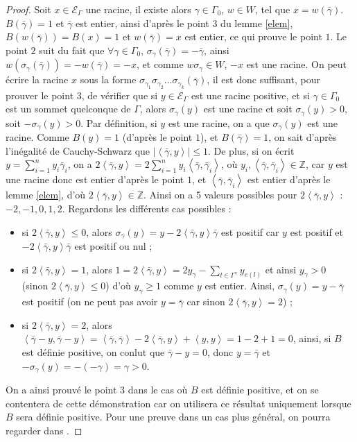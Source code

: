 \documentclass[a4paper,11pt]{article}
\newcommand{\ps}[2]{\left\langle#1,#2\right\rangle}
\newcommand{\EG}{\mathscr{E}_\Gamma}
\begin{document}
\begin{proof}
	Soit $x\in\EG$ une racine, il existe alors $\gamma\in\Gamma_0$, $w\in W$, tel que $x=w(\bar\gamma)$. $B(\bar\gamma)=1$ et $\bar\gamma$ est entier, ainsi d'après le point $3$ du lemme \ref{elem}, $B(w(\bar\gamma))=B(x)=1$ et $w(\bar\gamma)=x$ est entier, ce qui prouve le point $1$. Le point $2$ suit du fait que $\forall\gamma\in\Gamma_0$, $\sigma_\gamma(\bar\gamma)=-\bar\gamma$, ainsi $w(\sigma_\gamma(\bar\gamma))=-w(\bar\gamma)=-x$, et comme $w\sigma_\gamma\in W$, $-x$ est une racine. On peut écrire la racine $x$ sous la forme $\sigma_{\gamma_1}\sigma_{\gamma_2}\dots\sigma_{\gamma_k}(\bar\gamma)$, il est donc suffisant, pour prouver le point $3$, de vérifier que si $y\in\EG$ est une racine positive, et si $\gamma\in\Gamma_0$ est un sommet quelconque de $\Gamma$, alors $\sigma_\gamma(y)$ est une racine et soit $\sigma_\gamma(y)>0$, soit $-\sigma_\gamma(y)>0$. Par définition, si $y$ est une racine, on a que $\sigma_\gamma(y)$ est une racine. Comme $B(y)=1$ (d'après le point $1$), et $B(\bar\gamma)=1$, on sait d'après l'inégalité de Cauchy-Schwarz que $|\ps{\bar\gamma}{y}|\leq1$. De plus, si on écrit $y=\sum_{i=1}^ny_{i}\bar\gamma_i$, on a $2\ps{\bar\gamma}{y}=2\sum_{i=1}^ny_i\ps{\bar\gamma}{\bar\gamma_i}$, où $y_i,\ps{\bar\gamma}{\bar\gamma_i}\in\mathbb Z$, car $y$ est une racine donc est entier d'après le point $1$, et $\ps{\bar\gamma}{\bar\gamma_i}$ est entier d'après le lemme \ref{elem}, d'où $2\ps{\bar\gamma}{y}\in\mathbb Z$. Ainsi on a 5 valeurs possibles pour $2\ps{\bar\gamma}{y}$ : $-2,-1,0,1,2$. Regardons les différents cas possibles :
	\begin{itemize}
		\item si $2\ps{\bar\gamma}{y}\leq0$, alors $\sigma_\gamma(y)=y-2\ps{\bar\gamma}{y}\bar\gamma$ est positif car $y$ est positif et $-2\ps{\bar\gamma}{y}\bar\gamma$ est positif ou nul ;
		\item si $2\ps{\bar\gamma}{y}=1$, alors $1=2\ps{\bar\gamma}{y}=2y_\gamma-\sum_{l\in\Gamma^\gamma}y_{e(l)}$ et ainsi $y_\gamma>0$ (sinon $2\ps{\bar\gamma}{y}\leq0$) d'où $y_\gamma\geq1$ comme $y$ est entier. Ainsi, $\sigma_\gamma(y)=y-\bar\gamma$ est positif (on ne peut pas avoir $y=\bar\gamma$ car sinon $2\ps{\bar\gamma}{y}=2$) ;
		\item si $2\ps{\bar\gamma}{y}=2$, alors $\ps{\bar\gamma-y}{\bar\gamma-y}=\ps{\bar\gamma}{\bar\gamma}-2\ps{\bar\gamma}{y}+\ps{y}{y}=1-2+1=0$, ainsi, si $B$ est définie positive, on conlut que $\bar\gamma-y=0$, donc $y=\bar\gamma$ et $-\sigma_\gamma(y)=-(-\gamma)=\gamma>0$.
	\end{itemize}
	On a ainsi prouvé le point $3$ dans le cas où $B$ est définie positive, et on se contentera de cette démonstration car on utilisera ce résultat uniquement lorsque $B$ sera définie positive. Pour une preuve dans un cas plus général, on pourra regarder dans \cite{S66}. 
\end{proof}
\end{document}
